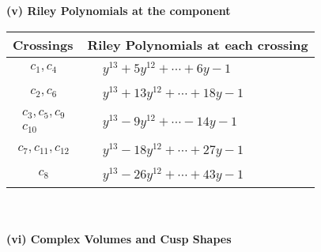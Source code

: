 \documentclass[1p]{elsarticle_modified}
\theoremstyle{definition}
\begin{document}
\newpage\renewcommand{\arraystretch}{1}
\flushleft \textbf{(v) Riley Polynomials at the component}\newline \\
\begin{tabular}{m{50pt}|m{274pt}}
Crossings & \hspace{64pt}Riley Polynomials at each crossing \\
\hline $$\begin{aligned}c_{1},c_{4}\end{aligned}$$&$\begin{aligned}
&y^{13}+5 y^{12}+\cdots+6 y-1
\end{aligned}$\\
\hline $$\begin{aligned}c_{2},c_{6}\end{aligned}$$&$\begin{aligned}
&y^{13}+13 y^{12}+\cdots+18 y-1
\end{aligned}$\\
\hline $$\begin{aligned}c_{3},c_{5},c_{9}\\c_{10}\end{aligned}$$&$\begin{aligned}
&y^{13}-9 y^{12}+\cdots-14 y-1
\end{aligned}$\\
\hline $$\begin{aligned}c_{7},c_{11},c_{12}\end{aligned}$$&$\begin{aligned}
&y^{13}-18 y^{12}+\cdots+27 y-1
\end{aligned}$\\
\hline $$\begin{aligned}c_{8}\end{aligned}$$&$\begin{aligned}
&y^{13}-26 y^{12}+\cdots+43 y-1
\end{aligned}$\\
\hline
\end{tabular}\\~\\
\newpage\flushleft \textbf{(vi) Complex Volumes and Cusp Shapes}
\end{document}
